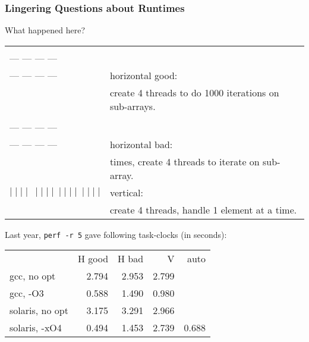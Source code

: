 \begin{frame}[containsverbatim]
  \frametitle{Lingering Questions about Runtimes}

  
    What happened here?\\[1em]
  
    \begin{tabular}{ll}
      \begin{minipage}{5em} --- --- --- ---\\[-.8em] --- --- --- ---\\[-.8em] --- --- --- --- \end{minipage}& horizontal good: \\
      & \qquad create 4 threads to do 1000 iterations on sub-arrays.\\
      \begin{minipage}{5em} --- --- --- ---\\[-.8em] --- --- --- ---\\[-.8em] --- --- --- --- \end{minipage}& horizontal bad: \\
      & \qquad 1000 times, create 4 threads to iterate on sub-array. \\
      $ \mid \mid \mid\mid \: \mid \mid \mid \mid \: \mid \mid \mid \mid\: \mid \mid \mid \mid$& vertical:\\
      & \qquad create 4 threads, handle 1 element at a time.\\[1em]
    \end{tabular}
    
      
      Last year, {\tt perf -r 5} gave following task-clocks (in seconds):\\[1em]

      \begin{center}
      \begin{tabular}{lrrrr}
        & H good & H bad & V & auto \\
        gcc, no opt & 2.794 & 2.953 & 2.799\\
        gcc, -O3 & 0.588 & 1.490 & 0.980\\
        solaris, no opt & 3.175 & 3.291 & 2.966 \\
        solaris, -xO4 & 0.494 & 1.453 & 2.739 & 0.688\\
      \end{tabular}
      \end{center}
  
\end{frame}

